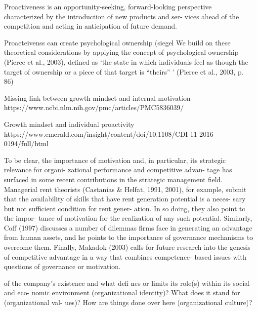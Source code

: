 







Proactiveness is an opportunity-seeking, forward-looking perspective characterized by the introduction of new products and ser- vices ahead of the competition and acting in anticipation of future demand.

Proacteivenss can create psychological ownership (siegel 
We build on these theoretical considerations by applying the concept of psychological ownership (Pierce et al., 2003), defined as ‘the state in which individuals feel as though the target of ownership or a piece of that target is “theirs” ’ (Pierce et al., 2003, p. 86)

Missing link between growth mindset and internal motivation
https://www.ncbi.nlm.nih.gov/pmc/articles/PMC5836039/

Growth mindset and individual proactivity
https://www.emerald.com/insight/content/doi/10.1108/CDI-11-2016-0194/full/html



To be clear, the importance of motivation and, in particular, its strategic relevance for
organi- zational performance and competitive advan- tage has surfaced in some recent
contributions in the strategic management field. Managerial rent theorists (Castanias &
Helfat, 1991, 2001), for example, submit that the availability of skills that have rent
generation potential is a neces- sary but not sufficient condition for rent gener-
ation. In so doing, they also point to the impor- tance of motivation for the realization
of any such potential. Similarly, Coff (1997) discusses a number of dilemmas firms face in
generating an advantage from human assets, and he points to the importance of governance
mechanisms to overcome them. Finally, Makadok (2003) calls for future research into the
genesis of competitive advantage in a way that combines competence- based issues with
questions of governance or motivation.

of the
company’s existence and what defi nes or limits its role(s) within its social and eco-
nomic environment (organizational identity)? What does it stand for (organizational val-
ues)? How are things done over here (organizational culture)?

